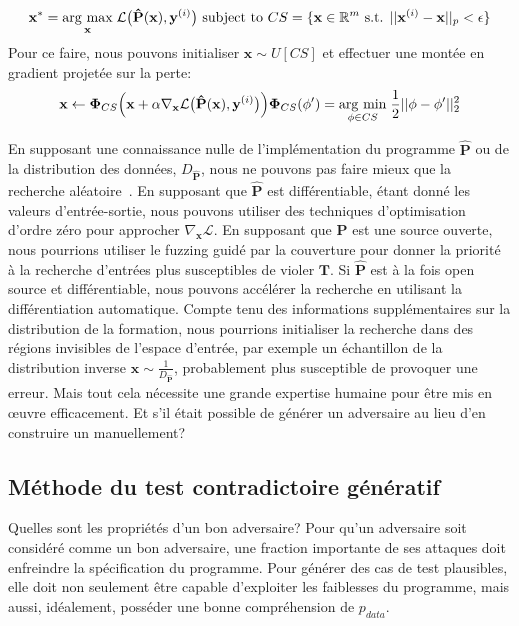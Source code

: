 %
\begin{equation}
\mathbf{x}^* = \underset{\mathbf{x}}{\operatorname{arg}\,\operatorname{max}}\;\mathcal{L}\big(\mathbf{\hat P}(\mathbf{x}), \mathbf{y}^{(i)}\big) \text{ subject to } CS = \{\mathbf{x} \in \mathbb{R}^m \text{ s.t. } ||\mathbf{x}^{(i)} - \mathbf{x}||_p    < \epsilon\}
\end{equation}
%
Pour ce faire, nous pouvons initialiser $\mathbf{x} \sim U[CS]$ et effectuer une montée en gradient projetée sur la perte:
%
\begin{equation}\label{eq:projected_gd}
\mathbf x \leftarrow \bm\Phi_{CS}\Big(\mathbf x + \alpha\mathbf\nabla_{\mathbf x} \mathcal{L}\big(\mathbf{\hat P}(\mathbf{x}), \mathbf{y}^{(i)}\big)\Big)
\bm\Phi_{CS}(\mathbf \phi') = \underset{\mathbf \phi \in CS}{\operatorname{arg}\,\operatorname{min}}\;\frac{1}{2}||\mathbf \phi - \mathbf \phi'||^2_2
\end{equation}
%

En supposant une connaissance nulle de l'implémentation du programme $\mathbf{\hat P}$ ou de la distribution des données, $D_{\mathbf{\hat P}}$, nous ne pouvons pas faire mieux que la recherche aléatoire~\citep{wolpert1997no}. En supposant que $\mathbf{\hat P}$ est différentiable, étant donné les valeurs d'entrée-sortie, nous pouvons utiliser des techniques d'optimisation d'ordre zéro pour approcher $\nabla_{\mathbf{x}}\mathcal{L}$. En supposant que $\mathbf{\hat P}$ est une source ouverte, nous pourrions utiliser le fuzzing guidé par la couverture pour donner la priorité à la recherche d'entrées plus susceptibles de violer $\mathbf T$. Si $\mathbf{\hat P}$ est à la fois open source et différentiable, nous pouvons accélérer la recherche en utilisant la différentiation automatique. Compte tenu des informations supplémentaires sur la distribution de la formation, nous pourrions initialiser la recherche dans des régions invisibles de l'espace d'entrée, par exemple un échantillon de la distribution inverse $\mathbf x \sim \frac{1}{D_{\mathbf{\hat P}}}$, probablement plus susceptible de provoquer une erreur. Mais tout cela nécessite une grande expertise humaine pour être mis en œuvre efficacement. Et s'il était possible de générer un adversaire au lieu d'en construire un manuellement?

\subsection{Méthode du test contradictoire génératif}

Quelles sont les propriétés d'un bon adversaire? Pour qu'un adversaire soit considéré comme un bon adversaire, une fraction importante de ses attaques doit enfreindre la spécification du programme. Pour générer des cas de test plausibles, elle doit non seulement être capable d'exploiter les faiblesses du programme, mais aussi, idéalement, posséder une bonne compréhension de $p_{data}$.

